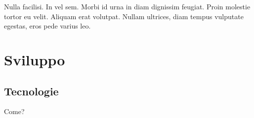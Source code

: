 \begin{savequote}[75mm]
Nulla facilisi. In vel sem. Morbi id urna in diam dignissim feugiat. Proin molestie tortor eu velit. Aliquam erat volutpat. Nullam ultrices, diam tempus vulputate egestas, eros pede varius leo.
\end{savequote}

\chapter{Sviluppo}
\section{Tecnologie}

Come?

